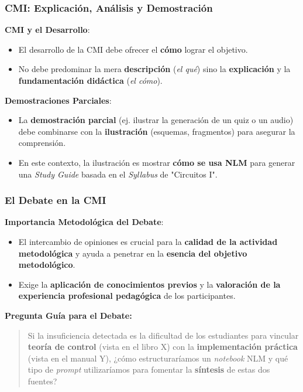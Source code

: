 \documentclass[aspectratio=43]{beamer}
\begin{document}
\begin{frame}
\frametitle{ CMI: Explicación, Análisis y Demostración}

\textbf{CMI y el Desarrollo}:
\begin{itemize}
    \item El desarrollo de la CMI debe ofrecer el \textbf{cómo} lograr el objetivo.
    \item No debe predominar la mera \textbf{descripción} (\textit{el qué}) sino la \textbf{explicación} y la \textbf{fundamentación didáctica} (\textit{el cómo}).
\end{itemize}

\vfill
\textbf{Demostraciones Parciales}:
\begin{itemize}
    \item La \textbf{demostración parcial} (ej. ilustrar la generación de un quiz o un audio) debe combinarse con la \textbf{ilustración} (esquemas, fragmentos) para asegurar la comprensión.
    \item En este contexto, la ilustración es mostrar \textbf{cómo se usa NLM} para generar una \textit{Study Guide} basada en el \textit{Syllabus} de "Circuitos I".
\end{itemize}
\end{frame}

\begin{frame}
\frametitle{ El Debate en la CMI}

\textbf{Importancia Metodológica del Debate}:
\begin{itemize}
    \item El intercambio de opiniones es crucial para la \textbf{calidad de la actividad metodológica} y ayuda a penetrar en la \textbf{esencia del objetivo metodológico}.
    \item Exige la \textbf{aplicación de conocimientos previos} y la \textbf{valoración de la experiencia profesional pedagógica} de los participantes.
\end{itemize}

\vfill
\textbf{Pregunta Guía para el Debate:}
\begin{quote}
Si la insuficiencia detectada es la dificultad de los estudiantes para vincular \textbf{teoría de control} (vista en el libro X) con la \textbf{implementación práctica} (vista en el manual Y), ¿cómo estructuraríamos un \textit{notebook} NLM y qué tipo de \textit{prompt} utilizaríamos para fomentar la \textbf{síntesis} de estas dos fuentes?
\end{quote}
\end{frame}
\end{document}
